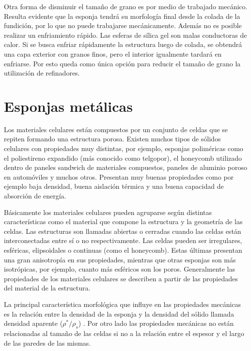 \documentclass[a4paper,12pt,fleqn,twoside,openany]{book}
\begin{document}
Otra forma de disminuir el tamaño de grano es por medio de trabajado mecánico. Resulta evidente que la esponja tendrá su morfología final desde la colada de la 
fundición, por lo que no puede trabajarse mecánicamente. Además no es posible realizar un enfriamiento rápido. Las esferas de sílica gel son malas conductoras de 
calor. Si se busca enfriar rápidamente la estructura luego de colada, se obtendrá una capa exterior con granos finos, pero el interior igualmente tardará en 
enfriarse. Por esto queda como única opción para reducir el tamaño de grano la utilización de refinadores.


\section{Esponjas metálicas}

Los materiales celulares están compuestos por un conjunto de celdas que se repiten formando una estructura porosa. Existen muchos tipos de sólidos celulares 
con propiedades muy distintas, por ejemplo, esponjas poliméricas como el poliestireno expandido (más conocido como telgopor), el honeycomb utilizado dentro 
de paneles sandwich de materiales compuestos, paneles de aluminio poroso en automóviles y muchos otros. Presentan muy buenas propiedades como por ejemplo 
baja densidad, buena aislación térmica y una buena capacidad de absorción de energía.

Básicamente los materiales celulares pueden agruparse según distintas características como el material que compone la estructura y la geometría de las 
celdas. Las estructuras son llamadas abiertas o cerradas cuando las celdas están interconectadas entre sí o no respectivamente. Las celdas pueden ser irregulares, esféricas, elipsoidales o continuas (como el honeycomb). Estas últimas presentan una gran anisotropía en sus propiedades, mientras que otras 
esponjas son más isotrópicas, por ejemplo, cuanto más esféricos son los poros. Generalmente las propiedades de los materiales celulares se describen a partir de las 
propiedades del material de la estructura. 

La principal característica morfológica que influye en las propiedades mecánicas es la relación entre la densidad de la esponja y la densidad 
del sólido llamada densidad aparente ($\rho^* / \rho_s$) \cite{cellular}. Por otro lado las propiedades mecánicas no están relacionadas al tamaño 
de las celdas si no a la relación entre el espesor y el largo de las paredes de las mismas.  

\end{document}
